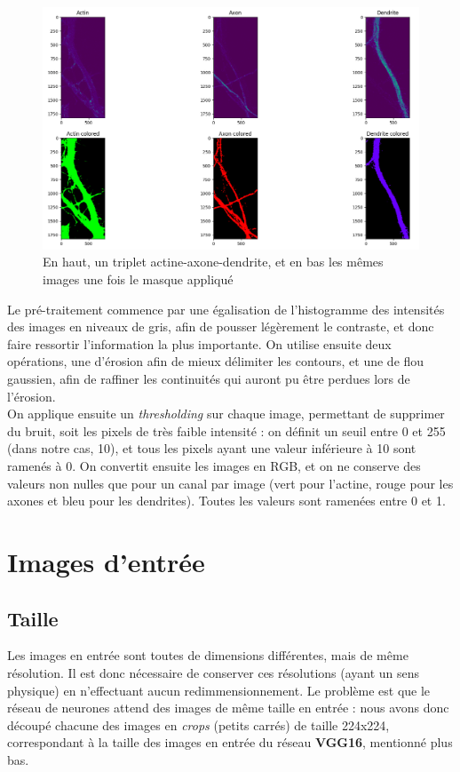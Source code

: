 \documentclass{report}
\begin{document}
\begin{figure}[H]
\centering
\includegraphics[scale=0.35]{"ex_mask"}
\caption{En haut, un triplet actine-axone-dendrite, et en bas les mêmes images une fois le masque appliqué}
\end{figure}

Le pré-traitement commence par une égalisation de l'histogramme des intensités
des images en niveaux de gris, afin de pousser légèrement le contraste, et donc faire
ressortir l'information la plus importante. On utilise ensuite deux opérations, une d'érosion
afin de mieux délimiter les contours, et une de flou gaussien,
afin de raffiner les continuités qui auront pu être perdues lors de l'érosion. \\
On applique ensuite un \textit{thresholding} sur chaque image,
permettant de supprimer du bruit, soit les pixels de très faible intensité :
on définit un seuil entre 0 et 255 (dans notre cas, 10), et tous les pixels ayant
une valeur inférieure à 10 sont ramenés à 0. On convertit ensuite les images en
RGB, et on ne conserve des valeurs non nulles que pour un canal par image (vert pour
l'actine, rouge pour les axones et bleu pour les dendrites). Toutes les valeurs
sont ramenées entre 0 et 1.

\section{Images d'entrée}

\subsection{Taille}

Les images en entrée sont toutes de dimensions différentes, mais de même résolution.
Il est donc nécessaire de conserver ces résolutions (ayant un sens physique) en
n'effectuant aucun redimmensionnement. Le problème est que le réseau de neurones
attend des images de même taille en entrée : nous avons donc découpé chacune des
images en \textit{crops} (petits carrés) de taille 224x224, correspondant à la taille
des images en entrée du réseau \textbf{VGG16}, mentionné plus bas.
\end{document}

